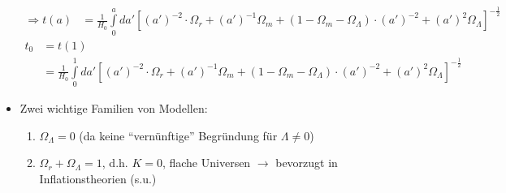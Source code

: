 \begin{itemize}
\begin{align*}
			\Rightarrow t(a)&=\frac{1}{H_0}\int\limits_0^ada'\left[(a')^{-2}\cdot\Omega_r+(a')^{-1}\Omega_m+\left(1-\Omega_m-\Omega_\Lambda\right)\cdot(a')^{-2}+(a')^2\Omega_\Lambda\right]^{-\frac{1}{2}}
		\end{align*}
		\begin{align*}
			t_0&=t(1)\\
			&=\frac{1}{H_0}\int\limits_0^1da'\left[(a')^{-2}\cdot\Omega_r+(a')^{-1}\Omega_m+\left(1-\Omega_m-\Omega_\Lambda\right)\cdot(a')^{-2}+(a')^2\Omega_\Lambda\right]^{-\frac{1}{2}}
		\end{align*}
	\item Zwei wichtige Familien von Modellen:
		\begin{enumerate}[label={$(\roman*)$}]
			\item $\Omega_\Lambda = 0$ (da keine "`vernünftige"' Begründung für $\Lambda\neq 0$)
			\item $\Omega_r+\Omega_\Lambda=1$, d.h. $K=0$, flache Universen $\to$ bevorzugt in Inflationstheorien (s.u.)
				\begin{figure}[H]
				\end{figure}
		\end{enumerate}
\end{itemize}
